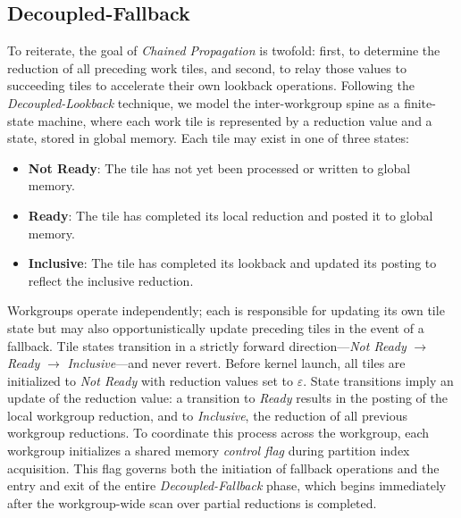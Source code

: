 \documentclass[sigconf]{acmart}
\begin{document}
\subsection{Decoupled-Fallback}
To reiterate, the goal of \emph{Chained Propagation} is twofold: first, to determine the reduction of all preceding work tiles, and second, to relay those values to succeeding tiles to accelerate their own lookback operations. Following the \emph{Decoupled-Lookback} technique, we model the inter-workgroup spine as a finite-state machine, where each work tile is represented by a reduction value and a state, stored in global memory. Each tile may exist in one of three states:
\begin{itemize}
  \item \textbf{Not Ready}: The tile has not yet been processed or written to global memory.
  \item \textbf{Ready}: The tile has completed its local reduction and posted it to global memory.
  \item \textbf{Inclusive}: The tile has completed its lookback and updated its posting to reflect the inclusive reduction.
\end{itemize}
Workgroups operate independently; each is responsible for updating its own tile state but may also opportunistically update preceding tiles in the event of a fallback. Tile states transition in a strictly forward direction---\emph{Not Ready} $\rightarrow$ \emph{Ready} $\rightarrow$ \emph{Inclusive}---and never revert. Before kernel launch, all tiles are initialized to \emph{Not Ready} with reduction values set to $\varepsilon$. State transitions imply an update of the reduction value: a transition to \emph{Ready} results in the posting of the local workgroup reduction, and to \emph{Inclusive}, the reduction of all previous workgroup reductions. To coordinate this process across the workgroup, each workgroup initializes a shared memory \emph{control flag} during partition index acquisition. This flag governs both the initiation of fallback operations and the entry and exit of the entire \emph{Decoupled-Fallback} phase, which begins immediately after the workgroup-wide scan over partial reductions is completed.
\end{document}
